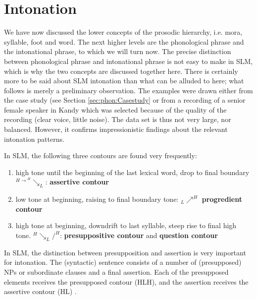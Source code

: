 \section{Intonation}\label{sec:phon:Intonation}
\glossINTmode

We have now discussed the lower concepts of the prosodic hierarchy, i.e. mora, syllable, foot and word. The next higher levels are the phonological phrase and the intonational phrase, to which we will turn now. The precise distinction between phonological phrase and intonational phrase is not easy to make in SLM, which is why the two concepts are discussed together here. There is certainly more to be said about SLM intonation than what can be alluded to here; what follows is merely a preliminary observation. The examples were drawn either from the case study (see Section \ref{sec:phon:Casestudy} or from a recording of a senior female speaker in Kandy which was selected because of the quality of the recording (clear voice, little noise). The data set is thus not very large, nor balanced. However, it confirms impressionistic findings about the relevant intonation patterns.

In SLM, the following three contours are found very frequently:

\begin{enumerate}
 \item high tone until the beginning of the last lexical word, drop to final boundary $^{H\longrightarrow}^H\searrow _L$: \textbf{assertive contour}
 \item low tone at beginning, raising to final boundary tone: $_L\nearrow ^H$ \textbf{progredient contour}
 \item high tone at beginning, downdrift to last syllable, steep rise to final high tone. $^H\searrow _L / ^H$: \textbf{presuppositive contour} and \textbf{question contour}
\end{enumerate}

In SLM, the distinction between presupposition and assertion is very important for intonation. The (syntactic) sentence consists of a number of (presupposed) NPs or subordinate clauses and a final assertion. Each of the presupposed elements receives the presupposed contour (HLH), and the assertion receives the assertive contour (HL) .



